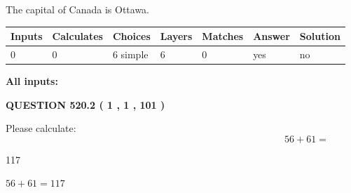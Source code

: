 \documentclass[12pt]{article}
\begin{document}
 
The capital of Canada is Ottawa.
 
 
\noindent{}
 
 
   
   
   
   
\noindent\begin{tabular}{|l|l|l|l|l|l|l|}
 \hline
Inputs & Calculates & Choices & Layers & Matches & Answer & Solution \\ \hline
 0  & 
 0  & 
 6
  simple  
  & 
 6  & 
 0  & 
  yes & 
  no 
  \\ \hline
 \end{tabular}
   
   
   
   
\noindent{}
   
   
   
   
\noindent\vspace{0.1in}\hspace{-0.08in} {\textbf{\Large{All inputs: }}}
   
   
  
\vspace{0.2in}
  
{\textbf{\Large{QUESTION
520.2 
 ( 1 , 1 , 101 )
}}}
  
  
 
Please calculate:
\begin{equation}
56 +  %
61 = \nonumber
\end{equation}
 
 
 
\noindent{}
 
 

117
 
 
\noindent{}
 
 

 
 
 
\noindent{}
 
 

$ %
56 +  %
61=   %
117$
 
 
\noindent{}
 
\end{document}
